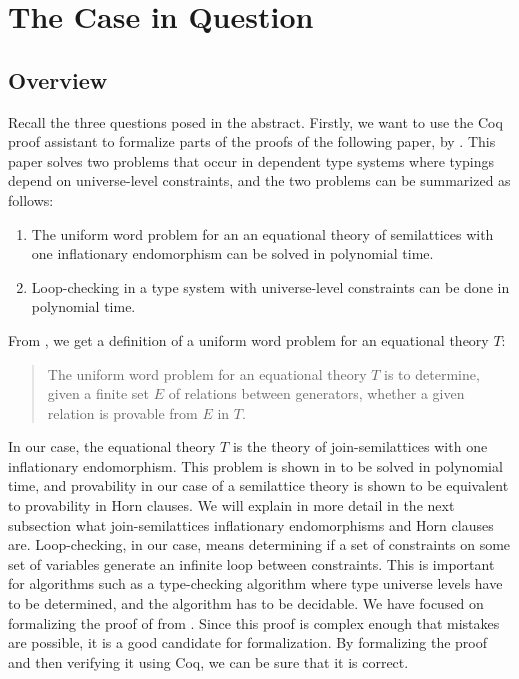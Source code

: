 \chapter{The Case in Question}
\label{ch:the_case_in_question}

\section{Overview}
\label{sec:overview}

Recall the three questions posed in the abstract.
Firstly, we want to use the Coq proof assistant to formalize parts of the proofs of the following paper, by \citeauthor{mbezem} \cite{mbezem}.
This paper solves two problems that occur in dependent type systems where typings depend
on universe-level constraints, and the two problems can be summarized as follows:

\begin{enumerate}
    \item The uniform word problem for an an equational theory of semilattices
          with one inflationary endomorphism can be solved in polynomial time.
    \item Loop-checking in a type system with universe-level constraints
          can be done in polynomial time.
\end{enumerate}

From \cite{mbezem}, we get a definition of a uniform word problem for an equational theory $T$:

\begin{quote}
The uniform word problem for an equational theory $T$ is to determine,
given a finite set $E$ of relations between generators,
whether a given relation is provable from $E$ in $T$.
\end{quote}
In our case, the equational theory $T$ is the theory of join-semilattices
with one inflationary endomorphism.
This problem is shown in \cite{mbezem} to be solved in polynomial time,
and provability in our case of a semilattice theory is shown to be equivalent to
provability in Horn clauses.
We will explain in more detail in the next subsection what join-semilattices
inflationary endomorphisms and Horn clauses are.
Loop-checking, in our case, means determining if a set of constraints
on some set of variables generate an infinite loop between constraints.
This is important for algorithms such as a type-checking algorithm where
type universe levels have to be determined, and the algorithm has to be decidable.
We have focused on formalizing the proof of  from \cite{mbezem}.
Since this proof is complex enough that mistakes are possible, it is a good candidate for formalization.
By formalizing the proof and then verifying it using Coq, we can be sure that it is correct.

